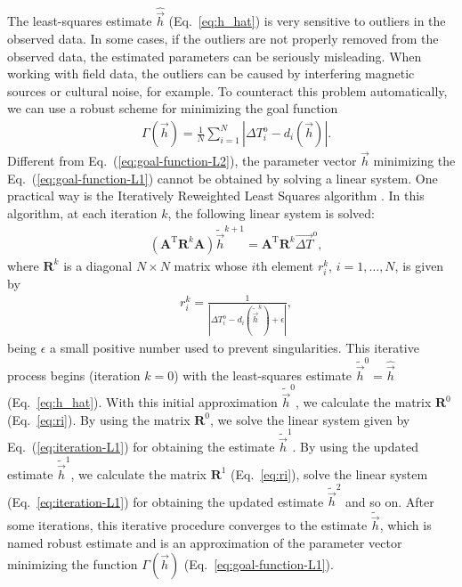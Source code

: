 \documentclass[journal abbreviation, npg]{copernicus}
\begin{document}
The least-squares estimate $\hat{\vec{h}}$ (Eq.~\ref{eq:h_hat}) is very
sensitive to outliers in the observed data. In some cases, if the outliers
are not properly removed from the observed data, the estimated parameters can
be seriously misleading. When working with field data, the outliers can be
caused by interfering magnetic sources or cultural noise, for example. To
counteract this problem automatically, we can use a robust scheme for
minimizing the goal function
\begin{align}
 &
\Gamma(\vec{h}) = \frac{1}{N} \sum_{i = 1}^{N}
\left\vert \Delta T^\mathrm{o}_{i} - d_{i}(\vec{h}) \right\vert .
\label{eq:goal-function-L1}
\end{align}
Different from Eq.~(\ref{eq:goal-function-L2}), the parameter vector
$\vec{h}$ minimizing the Eq.~(\ref{eq:goal-function-L1}) cannot be
obtained by solving a linear system. One practical way is the
Iteratively Reweighted Least Squares algorithm \citep{scales_1988,aster-etal2005}. In this algorithm, at each iteration $k$, the
following linear system is solved:
\begin{align}
 &
(\mathbf{A}^{\mathrm{T}} \mathbf{R}^{k} \mathbf{A} ) \tilde{\vec{h}}^{k+1} =
\mathbf{A}^{\mathrm{T}} \mathbf{R}^{k} \vec{\Delta T}^\mathrm{o} ,
\label{eq:iteration-L1}
\end{align}
where $\mathbf{R}^{k}$ is a diagonal $N \times N$ matrix whose $i$th
element $r_{i}^{k}$, $i = 1, \ldots, N$, is given by
\begin{align}
 &
r_{i}^{k} = \frac{1}{\left\vert \Delta T^\mathrm{o}_{i} - d_{i}\left(\tilde{\vec{h}}^{k}\right) + \epsilon \right\vert} ,
\label{eq:ri}
\end{align}
being $\epsilon$ a small positive number used to prevent singularities. This
iterative process begins (iteration $k = 0$) with the least-squares estimate
$\tilde{\vec{h}}^{0} = \hat{\vec{h}}$ (Eq.~\ref{eq:h_hat}). With this initial
approximation $\tilde{\vec{h}}^{0}$, we calculate the matrix $\mathbf{R}^{0}$
(Eq.~\ref{eq:ri}). By using the matrix $\mathbf{R}^{0}$, we solve the linear
system given by Eq.~(\ref{eq:iteration-L1}) for obtaining the estimate
$\tilde{\vec{h}}^{1}$. By using the updated estimate $\tilde{\vec{h}}^{1}$,
we calculate the matrix $\mathbf{R}^{1}$ (Eq.~\ref{eq:ri}), solve the linear
system (Eq.~\ref{eq:iteration-L1}) for obtaining the updated estimate
$\tilde{\vec{h}}^{2}$ and so on. After some iterations, this iterative
procedure converges to the estimate $\tilde{\vec{h}}$, which is named robust
estimate and is an approximation of the parameter vector minimizing the
function $\Gamma(\vec{h})$ (Eq.~\ref{eq:goal-function-L1}).
\end{document}
